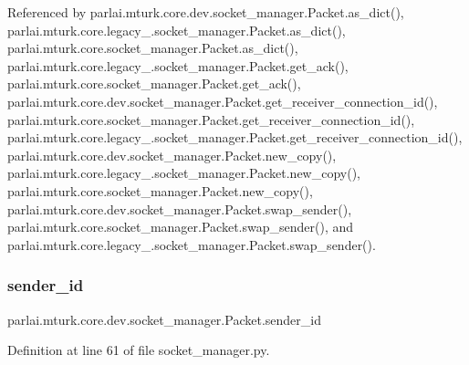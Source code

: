 Referenced by parlai.\+mturk.\+core.\+dev.\+socket\+\_\+manager.\+Packet.\+as\+\_\+dict(), parlai.\+mturk.\+core.\+legacy\+\_.\+socket\+\_\+manager.\+Packet.\+as\+\_\+dict(), parlai.\+mturk.\+core.\+socket\+\_\+manager.\+Packet.\+as\+\_\+dict(), parlai.\+mturk.\+core.\+legacy\+\_.\+socket\+\_\+manager.\+Packet.\+get\+\_\+ack(), parlai.\+mturk.\+core.\+socket\+\_\+manager.\+Packet.\+get\+\_\+ack(), parlai.\+mturk.\+core.\+dev.\+socket\+\_\+manager.\+Packet.\+get\+\_\+receiver\+\_\+connection\+\_\+id(), parlai.\+mturk.\+core.\+socket\+\_\+manager.\+Packet.\+get\+\_\+receiver\+\_\+connection\+\_\+id(), parlai.\+mturk.\+core.\+legacy\+\_.\+socket\+\_\+manager.\+Packet.\+get\+\_\+receiver\+\_\+connection\+\_\+id(), parlai.\+mturk.\+core.\+dev.\+socket\+\_\+manager.\+Packet.\+new\+\_\+copy(), parlai.\+mturk.\+core.\+legacy\+\_.\+socket\+\_\+manager.\+Packet.\+new\+\_\+copy(), parlai.\+mturk.\+core.\+socket\+\_\+manager.\+Packet.\+new\+\_\+copy(), parlai.\+mturk.\+core.\+dev.\+socket\+\_\+manager.\+Packet.\+swap\+\_\+sender(), parlai.\+mturk.\+core.\+socket\+\_\+manager.\+Packet.\+swap\+\_\+sender(), and parlai.\+mturk.\+core.\+legacy\+\_.\+socket\+\_\+manager.\+Packet.\+swap\+\_\+sender().

\mbox{\label{classparlai_1_1mturk_1_1core_1_1dev_1_1socket__manager_1_1Packet_a3095d75963017368974bd34c3aacfe8c}} 
\subsubsection{\texorpdfstring{sender\+\_\+id}{sender\_id}}
{\footnotesize\ttfamily parlai.\+mturk.\+core.\+dev.\+socket\+\_\+manager.\+Packet.\+sender\+\_\+id}



Definition at line 61 of file socket\+\_\+manager.\+py.



